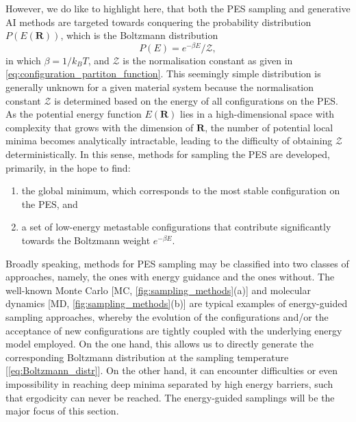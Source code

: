 However, we do like to highlight here, that both the PES sampling and generative AI methods are targeted towards conquering the probability distribution $P(E(\bm{R}))$, which is  the Boltzmann distribution 
\begin{equation}
    \label{eq:Boltzmann_distr}
    P(E)=e^{-\beta E}/\mathcal{Z},
\end{equation}
in which $\beta=1/k_B T$, and $\mathcal{Z}$ is the normalisation constant as given in \cref{eq:configuration_partiton_function}. This seemingly simple distribution is generally unknown for a given material system because the normalisation constant $\mathcal{Z}$ is determined based on the energy of all configurations on the PES. As the potential energy function $E(\bm{R})$ lies in a high-dimensional space with complexity that grows with the dimension of $\bm{R}$, the number of potential local minima becomes  analytically intractable, leading to the difficulty of obtaining $\mathcal{Z}$ deterministically. In this sense, methods for sampling the PES are developed, primarily, in the hope to find:
\begin{enumerate}
    \item the global minimum, which corresponds to the most stable configuration on the PES, and
    \item  a set of low-energy metastable configurations that contribute significantly towards the Boltzmann weight $e^{-\beta E}$.
\end{enumerate}

Broadly speaking, methods for PES sampling may be classified into two classes of approaches, namely, the ones with energy guidance and the ones without. The well-known Monte Carlo [MC, \cref{fig:sampling_methods}(a)] and molecular dynamics [MD, \cref{fig:sampling_methods}(b)] are typical examples of energy-guided sampling approaches, whereby the evolution of the configurations and/or the acceptance of new configurations are tightly coupled with the underlying energy model employed. On the one hand, this allows us to directly generate the corresponding Boltzmann distribution at the sampling temperature [\cref{eq:Boltzmann_distr}]. On the other hand, it can encounter difficulties or even impossibility in reaching deep minima separated by high energy barriers, such that ergodicity can never be reached.\cite{wales1997global,doye1999evolution} The energy-guided samplings will be the major focus of this section. 

